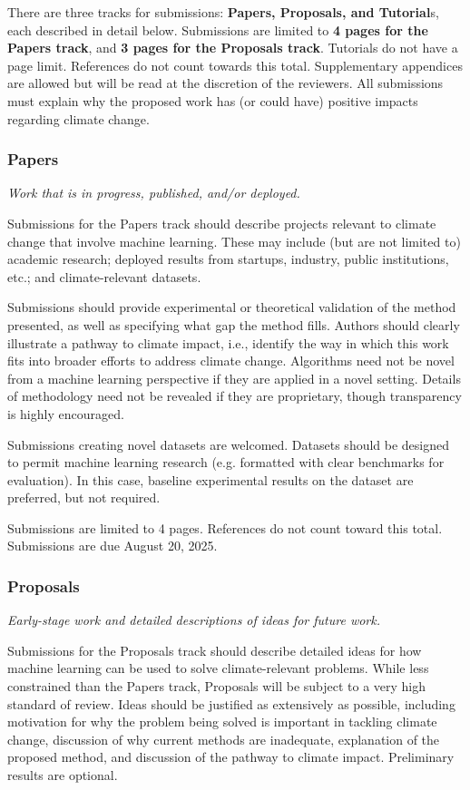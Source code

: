 \documentclass{article}
\begin{document}
There are three tracks for submissions: \textbf{Papers, Proposals, and Tutorial}s, each described in detail below.  Submissions are limited to \textbf{4 pages for the Papers track}, and \textbf{3 pages for the Proposals track}. Tutorials do not have a page limit. References do not count towards this total. Supplementary appendices are allowed but will be read at the discretion of the reviewers. All submissions must explain why the proposed work has (or could have) positive impacts regarding climate change.

\subsubsection{Papers}

\textit{Work that is in progress, published, and/or deployed.}

Submissions for the Papers track should describe projects relevant to climate change that involve machine learning. These may include (but are not limited to) academic research; deployed results from startups, industry, public institutions, etc.; and climate-relevant datasets.

Submissions should provide experimental or theoretical validation of the method presented, as well as specifying what gap the method fills. Authors should clearly illustrate a pathway to climate impact, i.e., identify the way in which this work fits into broader efforts to address climate change. Algorithms need not be novel from a machine learning perspective if they are applied in a novel setting. Details of methodology need not be revealed if they are proprietary, though transparency is highly encouraged.

Submissions creating novel datasets are welcomed. Datasets should be designed to permit machine learning research (e.g. formatted with clear benchmarks for evaluation). In this case, baseline experimental results on the dataset are preferred, but not required.

Submissions are limited to 4 pages. References do not count toward this total. Submissions are due August 20, 2025.

\subsubsection{Proposals}

\textit{Early-stage work and detailed descriptions of ideas for future work.}

Submissions for the Proposals track should describe detailed ideas for how machine learning can be used to solve climate-relevant problems. While less constrained than the Papers track, Proposals will be subject to a very high standard of review. Ideas should be justified as extensively as possible, including motivation for why the problem being solved is important in tackling climate change, discussion of why current methods are inadequate, explanation of the proposed method, and discussion of the pathway to climate impact. Preliminary results are optional.
\end{document}
